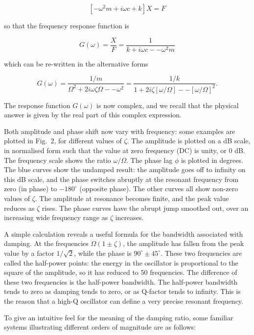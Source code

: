   $$[-\omega^2 m + i \omega c +k]X=F \tag{9}$$ 

  so that the frequency response function is 

  $$G(\omega) = \frac{X}{F} = \frac{1}{k+i \omega c -- \omega^2 m} \tag{10} $$ 

  which can be re-written in the alternative forms 

  $$G(\omega) = \frac{1/m}{\Omega^2+2i \omega \zeta \Omega -- \omega^2 }= 
  \frac{1/k}{1+2i \zeta [\omega/\Omega] -- [\omega/\Omega]^2 }. \tag{11} $$ 

  The response function $G(\omega)$ is now complex, and we recall that the 
  physical answer is given by the real part of this complex expression. 

  Both amplitude and phase shift now vary with frequency: some examples are 
  plotted in Fig.\ 2, for different values of $\zeta$. The amplitude is plotted 
  on a dB scale, in normalised form such that the value at zero frequency (DC) 
  is unity, or 0 dB. The frequency scale shows the ratio $\omega/\Omega$. The 
  phase lag $\phi$ is plotted in degrees. The blue curves show the undamped 
  result: the amplitude goes off to infinity on this dB scale, and the phase 
  switches abruptly at the resonant frequency from zero (in phase) to 
  $-180^\circ$ (opposite phase). The other curves all show non-zero values of 
  $\zeta$. The amplitude at resonance becomes finite, and the peak value 
  reduces as $\zeta$ rises. The phase curves have the abrupt jump smoothed out, 
  over an increasing wide frequency range as $\zeta$ increases. 

  A simple calculation reveals a useful formula for the bandwidth associated 
  with damping. At the frequencies $\Omega(1 \pm \zeta)$, the amplitude has 
  fallen from the peak value by a factor $1/\sqrt{2}$, while the phase is 
  $90^\circ \pm 45^\circ$. These two frequencies are called the half-power 
  points: the energy in the oscillator is proportional to the square of the 
  amplitude, so it has reduced to 50%
  frequencies. The difference of these two frequencies is the half-power 
  bandwidth. The half-power bandwidth tends to zero as damping tends to zero, 
  or as Q-factor tends to infinity. This is the reason that a high-Q oscillator 
  can define a very precise resonant frequency. 

  To give an intuitive feel for the meaning of the damping ratio, some familiar 
  systems illustrating different orders of magnitude are as follows: 

